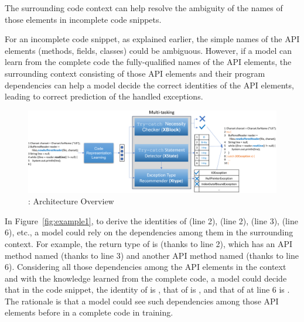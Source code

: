 \begin{Observation} 
\label{ob4}
The surrounding code context can help resolve the ambiguity of the
names of those elements in incomplete code snippets.
\end{Observation}

For an incomplete code snippet, as explained earlier, the simple names
of the API elements (methods, fields, classes) could be ambiguous.
However, if a model can learn from the complete code the
fully-qualified names of the API elements, the surrounding
context consisting of those API elements and their program
dependencies can help a model decide the correct identities of
the API elements, leading to correct prediction of the handled
exceptions.



\begin{figure}[htp]
\begin{center}
\includegraphics[width=5.6in]{overview-3.png}
\vspace{-10pt}
\caption{{\tool}: Architecture Overview}
\label{overview}
\end{center}
\end{figure}

In Figure~\ref{fig:example1}, to derive the identities of
 (line 2),  (line 2),
 (line 3),  (line 6), etc., a model
could rely on the dependencies among them in the surrounding context.
For example, the return type of  is
 (thanks to line 2), which has an API method named
 (thanks to line 3) and another API method named
 (thanks to line 6). Considering all those dependencies among
the API elements in the context and with the knowledge learned from
the complete code, a model could decide that in the code snippet, the identity of
 is , that of
 is
, and that of 
 at line 6 is
. The rationale is that a
model could see such dependencies among those API elements before in
a complete code in training.





